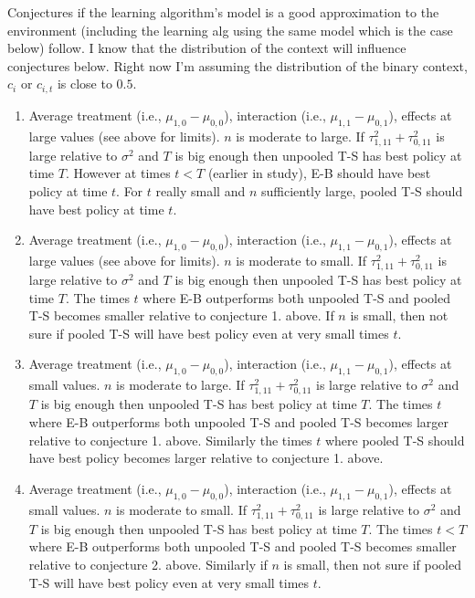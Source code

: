 \documentclass[letterpaper, 9pt]{extarticle}
\begin{document}
{Conjectures if the learning algorithm's model is a good approximation to the environment (including the learning alg using the same model which is the case below) follow.  I know that the distribution of the context will influence conjectures below.  Right now I'm assuming the distribution of the binary context, $c_i$ or $c_{i,t}$ is close to $0.5$.
\begin{enumerate}
    \item Average treatment (i.e., $\mu_{1,0}-\mu_{0,0}$), interaction (i.e., $ 
\mu_{1,1}-\mu_{0,1}$), effects at large values (see above for limits). $n$ is moderate to large. If $\tau_{1,11}^2+\tau_{0,11}^2$ is large relative to $\sigma^2$  and $T$ is big enough then unpooled T-S has best policy at time $T$.  However at times $t<T$ (earlier in study), E-B should have best policy at time $t$.  For $t$ really small and $n$  sufficiently large, pooled T-S should have best policy at time $t$.
\item Average treatment (i.e., $\mu_{1,0}-\mu_{0,0}$), interaction (i.e., $ 
\mu_{1,1}-\mu_{0,1}$), effects at large values (see above for limits).  $n$ is moderate to small.   If $\tau_{1,11}^2+\tau_{0,11}^2$ is large relative to $\sigma^2$  and $T$ is big enough then unpooled T-S has best policy at time $T$.  The times $t$  where E-B outperforms both unpooled T-S and pooled T-S becomes smaller relative to conjecture 1. above. If $n$ is small, then not sure if  pooled T-S will have best policy even at very small times $t$.   
        \item Average treatment (i.e., $\mu_{1,0}-\mu_{0,0}$), interaction (i.e., $ 
\mu_{1,1}-\mu_{0,1}$), effects at small values. $n$ is moderate to large. If $\tau_{1,11}^2+\tau_{0,11}^2$ is large relative to $\sigma^2$  and $T$ is big enough then unpooled T-S has best policy at time $T$.  The times $t$  where E-B outperforms both unpooled T-S and pooled T-S becomes larger relative to conjecture 1. above.
Similarly the times $t$  where pooled T-S should have best policy  becomes larger relative to conjecture 1. above.  
\item
Average treatment (i.e., $\mu_{1,0}-\mu_{0,0}$), interaction (i.e., $ 
\mu_{1,1}-\mu_{0,1}$), effects at small values. $n$ is moderate to small. If $\tau_{1,11}^2+\tau_{0,11}^2$ is large relative to $\sigma^2$  and $T$ is big enough then unpooled T-S has best policy at time $T$.  The times $t<T$  where E-B outperforms both unpooled T-S and pooled T-S becomes smaller relative to conjecture 2. above.
Similarly if $n$ is small, then not sure if  pooled T-S will have best policy even at very small times $t$. 
\end{enumerate}


}
\end{document}
